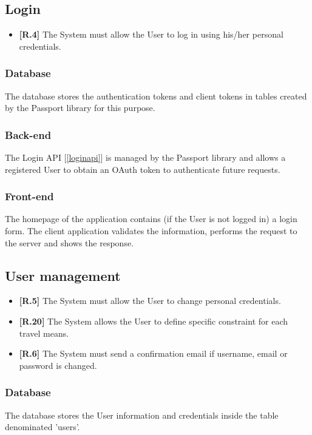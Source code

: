 \subsection{Login}
\begin{itemize}
	\item {\color{OliveGreen}\textbf{[R.4]}} The System must allow the User to log in using his/her
	personal credentials.
\end{itemize}
\subsubsection*{Database}
The database stores the authentication tokens and client tokens in tables created by the Passport library for this purpose.

\subsubsection*{Back-end}
The Login API [\ref{loginapi}] is managed by the Passport library and allows a registered User to obtain an OAuth token to authenticate future requests.

\subsubsection*{Front-end}
The homepage of the application contains (if the User is not logged in) a login form. The client application validates the information, performs the request to the server and shows the response.


\subsection{User management}
\begin{itemize}
\item {\color{OliveGreen}\textbf{[R.5]}} The System must allow the User to change personal credentials. 
\item {\color{OliveGreen}\textbf{[R.20]}} The System allows the User to define specific constraint for each travel means.
\item {\color{red}\textbf{[R.6]}} The System must send a confirmation email if username, email or password is changed.
\end{itemize}

\subsubsection*{Database}
The database stores the User information and credentials inside the table denominated 'users'.

